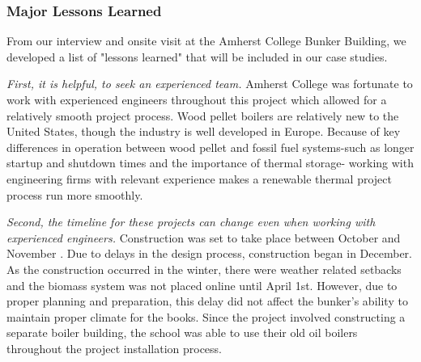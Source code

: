 \subsubsection{Major Lessons Learned}
\par From our interview and onsite visit at the Amherst College Bunker Building, we developed a list of "lessons learned" that will be included in our case studies. 
\par \emph{First, it is helpful,  to seek an experienced team.} Amherst College was fortunate to work with experienced engineers throughout this project which allowed for a relatively smooth project process. Wood pellet boilers are relatively new to the United States, though the industry is well developed in Europe. Because of key differences in operation between wood pellet and fossil fuel systems-such as longer startup and shutdown times and the importance of thermal storage- working with engineering firms with relevant experience makes a renewable thermal project process run more smoothly.
\par \emph{Second, the timeline for these projects can change even when working with experienced engineers.} Construction was set to take place between October  and November . Due to delays in the design process, construction began in December. As the construction occurred in the winter, there were weather related setbacks and the biomass system was not placed online until April 1st. However, due to proper planning and preparation, this delay did not affect the bunker's ability to maintain proper climate for the books. Since the project involved constructing a separate boiler building, the school was able to use their old oil boilers throughout the project installation process.


